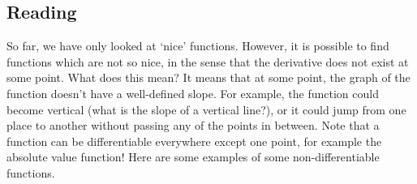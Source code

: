 



\subsection*{Reading}
So far, we have only looked at `nice' functions. However, it is possible to find functions which are not
so nice, in the sense that the derivative does not exist at some point. What does this mean? It means that
at some point, the graph of the function doesn't have a well-defined slope. For example, the function could
become vertical (what is the slope of a vertical line?), or it could jump from one place to another without
passing any of the points in between. Note that a function can be differentiable everywhere except one point,
for example the absolute value function! Here are some examples of some non-differentiable functions.

